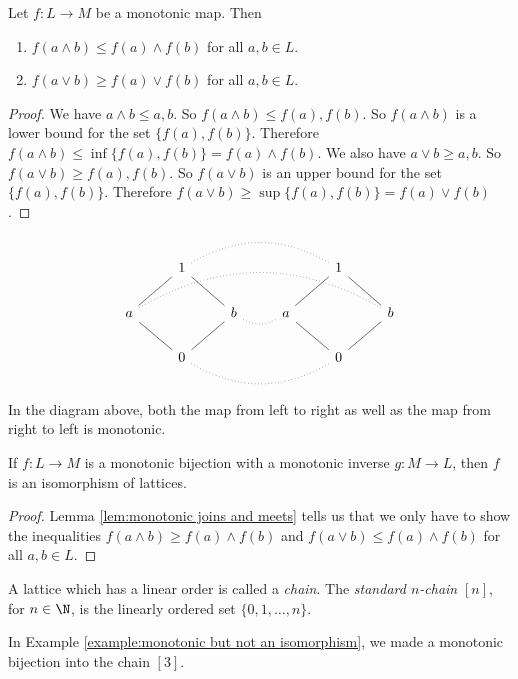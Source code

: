 \begin{lemma}
\label{lem:monotonic joins and meets}
Let $f : L \to M$ be a monotonic map. Then
\begin{enumerate}
	\item $f(a \wedge b) \leq f(a) \wedge f(b)$ for all $a,b \in L$.
	\item $f(a \vee b) \geq f(a) \vee f(b)$ for all $a,b \in L$.
\end{enumerate}
\end{lemma}
\begin{proof}
We have $a \wedge b \leq a,b$. So $f(a \wedge b) \leq f(a), f(b)$. So $f(a \wedge b)$ is a lower bound for the set $\{f(a),f(b)\}$. Therefore $f(a \wedge b) \leq \inf\{f(a),f(b)\} = f(a) \wedge f(b)$. We also have $a \vee b \geq a,b$. So $f(a \vee b) \geq f(a),f(b)$. So $f(a \vee b)$ is an upper bound for the set $\{f(a),f(b)\}$. Therefore $f(a \vee b) \geq \sup\{f(a),f(b)\} = f(a) \vee f(b)$.
\end{proof}
\begin{example}
\[ \begin{tikzcd}
  & 1 \arrow[dl, no head] \arrow[dr, no head] \arrow[rrr, no head, dotted, bend left] &   &   & 1 \arrow[dl, no head] \arrow[dr, no head] &   \\
a \arrow[dr, no head] \arrow[rrrrr, bend left, dotted, no head] &   & b \arrow[dl, no head] \arrow[r, bend right, dotted, no head] & a \arrow[dr, no head] &   & b \arrow[dl, no head] \\
  & 0 \arrow[rrr, no head, dotted, bend right] &   &   & 0 & 
\end{tikzcd} \]
In the diagram above, both the map from left to right as well as the map from right to left is monotonic.
\end{example}
\begin{lemma}
If $f : L \to M$ is a monotonic bijection with a monotonic inverse $g : M \to L$, then $f$ is an isomorphism of lattices.
\end{lemma}
\begin{proof}
Lemma \ref{lem:monotonic joins and meets} tells us that we only have to show the inequalities $f(a \wedge b) \geq f(a) \wedge f(b)$ and $f(a \vee b) \leq f(a) \wedge f(b)$ for all $a,b \in L$.
\end{proof}

\begin{definition}
A lattice which has a linear order is called a \emph{chain}. The \emph{standard $n$-chain} $[n]$, for $n \in \N$, is the linearly ordered set $\{0,1,\ldots,n\}$.
\end{definition}
In Example \ref{example:monotonic but not an isomorphism}, we made a monotonic bijection into the chain $[3]$.

